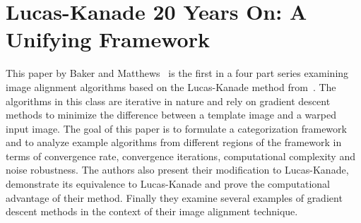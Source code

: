 \documentclass[letterpaper]{article}
\date{\today}
\begin{document}
\maketitle

\section{Lucas-Kanade 20 Years On: A Unifying Framework}
This paper by Baker and Matthews~\cite{lk-20-yrs} is the first in a
four part series examining image alignment algorithms based on the
Lucas-Kanade method from~\cite{lk-81}.  The algorithms in this class
are iterative in nature and rely on gradient descent methods to
minimize the difference between a template image and a warped input
image.  The goal of this paper is to formulate a categorization
framework and to analyze example algorithms from different regions of
the framework in terms of convergence rate, convergence iterations,
computational complexity and noise robustness.  The authors also
present their modification to Lucas-Kanade, demonstrate its
equivalence to Lucas-Kanade and prove the computational advantage of
their method.  Finally they examine several examples of gradient
descent methods in the context of their image alignment technique.







\end{document}
